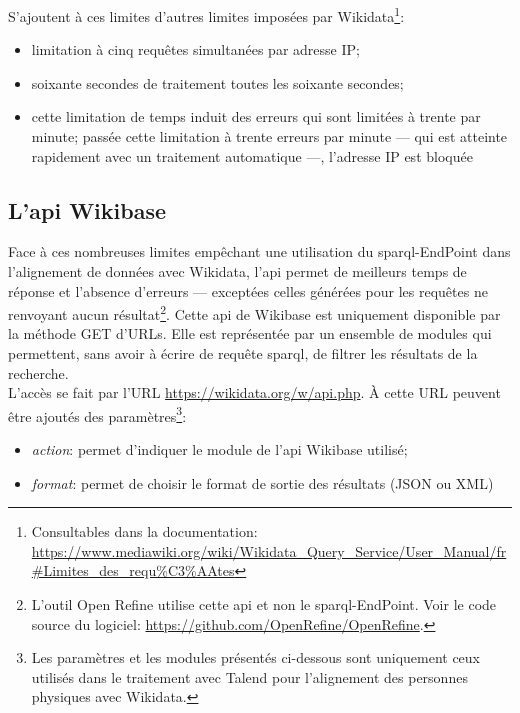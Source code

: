 S'ajoutent à ces limites d'autres limites imposées par Wikidata\footnote{Consultables dans la documentation: \url{https://www.mediawiki.org/wiki/Wikidata_Query_Service/User_Manual/fr\#Limites_des_requ\%C3\%AAtes}}:
\begin{itemize}
	\item limitation à cinq requêtes simultanées par adresse IP;
	\item soixante secondes de traitement toutes les soixante secondes;
	\item cette limitation de temps induit des erreurs qui sont limitées à trente par minute; passée cette limitation à trente erreurs par minute --- qui est atteinte rapidement avec un traitement automatique ---, l'adresse IP est bloquée
\end{itemize}

\subsection{\label{II-C-1-c}L'\ac{api} Wikibase}

Face à ces nombreuses limites empêchant une utilisation du \ac{sparql}-EndPoint dans l'alignement de données avec Wikidata, l'\ac{api} permet de meilleurs temps de réponse et l'absence d'erreurs --- exceptées celles générées pour les requêtes ne renvoyant aucun résultat\footnote{L'outil Open Refine utilise cette \ac{api} et non le \ac{sparql}-EndPoint. Voir le code source du logiciel: \url{https://github.com/OpenRefine/OpenRefine}.}. Cette \ac{api} de Wikibase est uniquement disponible par la méthode GET d'URLs. Elle est représentée par un ensemble de modules qui permettent, sans avoir à écrire de requête \ac{sparql}, de filtrer les résultats de la recherche.\\

L'accès se fait par l'URL \url{https://wikidata.org/w/api.php}. À cette URL peuvent être ajoutés des paramètres\footnote{Les paramètres et les modules présentés ci-dessous sont uniquement ceux utilisés dans le traitement avec Talend pour l'alignement des personnes physiques avec Wikidata.}:
\begin{itemize}
	\item \textit{action}: permet d'indiquer le module de l'\ac{api} Wikibase utilisé;
	\item \textit{format}: permet de choisir le format de sortie des résultats (JSON ou XML)
\end{itemize}
\medskip

